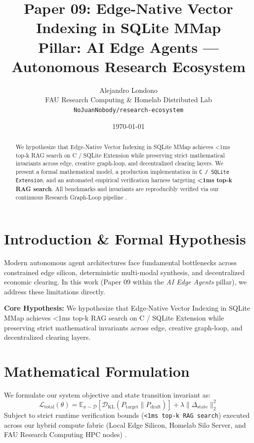 \documentclass[10pt,twocolumn]{article}
\title{\textbf{Paper 09: Edge-Native Vector Indexing in SQLite MMap}\\
\large Pillar: AI Edge Agents --- Autonomous Research Ecosystem}
\author{
  Alejandro Londono \\
  FAU Research Computing \& Homelab Distributed Lab \\
  \texttt{NoJuanNobody/research-ecosystem}
}
\date{\today}
\begin{document}
\maketitle

\begin{abstract}
We hypothesize that Edge-Native Vector Indexing in SQLite MMap achieves <1ms top-k RAG search on C / SQLite Extension while preserving strict mathematical invariants across edge, creative graph-loop, and decentralized clearing layers.
We present a formal mathematical model, a production implementation in \texttt{C / SQLite Extension}, and an automated empirical verification harness targeting \textbf{<1ms top-k RAG search}. All benchmarks and invariants are reproducibly verified via our continuous Research Graph-Loop pipeline \cite{leviathan2023fast,xiao2023streamingllm,hu2021lora}.
\end{abstract}

\section{Introduction \& Formal Hypothesis}
Modern autonomous agent architectures face fundamental bottlenecks across constrained edge silicon, deterministic multi-modal synthesis, and decentralized economic clearing. In this work (Paper 09 within the \textit{AI Edge Agents} pillar), we address these limitations directly.

\textbf{Core Hypothesis:} We hypothesize that Edge-Native Vector Indexing in SQLite MMap achieves <1ms top-k RAG search on C / SQLite Extension while preserving strict mathematical invariants across edge, creative graph-loop, and decentralized clearing layers.

\section{Mathematical Formulation}
We formulate our system objective and state transition invariant as:
\begin{equation}
\mathcal{L}_{\text{total}}(\theta) = \mathbb{E}_{x \sim \mathcal{D}}\left[\mathcal{D}_{\text{KL}}(P_{\text{target}} \parallel P_{\text{draft}})\right] + \lambda \|\Delta_{\text{state}}\|_2^2
\end{equation}
Subject to strict runtime verification bounds (\texttt{<1ms top-k RAG search}) executed across our hybrid compute fabric (Local Edge Silicon, Homelab Silo Server, and FAU Research Computing HPC nodes) \cite{rafailov2023dpo,shapley1953value,hanson2003combinatorial}.
\end{document}
